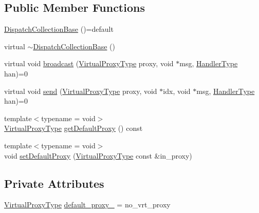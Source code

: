 \subsection*{Public Member Functions}
\begin{DoxyCompactItemize}
\item 
\hyperlink{structvt_1_1vrt_1_1collection_1_1_dispatch_collection_base_a96f6594a04faa4519a553b18bf2b2e6d}{Dispatch\+Collection\+Base} ()=default
\item 
virtual \hyperlink{structvt_1_1vrt_1_1collection_1_1_dispatch_collection_base_a8c27f42a9b91fd31b0aa7b30da4d614c}{$\sim$\+Dispatch\+Collection\+Base} ()
\item 
virtual void \hyperlink{structvt_1_1vrt_1_1collection_1_1_dispatch_collection_base_a339eda5b1ee045a9ec400d34bf91ac97}{broadcast} (\hyperlink{namespacevt_a1b417dd5d684f045bb58a0ede70045ac}{Virtual\+Proxy\+Type} proxy, void $\ast$msg, \hyperlink{namespacevt_af64846b57dfcaf104da3ef6967917573}{Handler\+Type} han)=0
\item 
virtual void \hyperlink{structvt_1_1vrt_1_1collection_1_1_dispatch_collection_base_a7e409e791d9eafb8fea0f4f7d97ad860}{send} (\hyperlink{namespacevt_a1b417dd5d684f045bb58a0ede70045ac}{Virtual\+Proxy\+Type} proxy, void $\ast$idx, void $\ast$msg, \hyperlink{namespacevt_af64846b57dfcaf104da3ef6967917573}{Handler\+Type} han)=0
\item 
{\footnotesize template$<$typename  = void$>$ }\\\hyperlink{namespacevt_a1b417dd5d684f045bb58a0ede70045ac}{Virtual\+Proxy\+Type} \hyperlink{structvt_1_1vrt_1_1collection_1_1_dispatch_collection_base_a7ff0d68977083eb225da837b6a8cef7d}{get\+Default\+Proxy} () const
\item 
{\footnotesize template$<$typename  = void$>$ }\\void \hyperlink{structvt_1_1vrt_1_1collection_1_1_dispatch_collection_base_a3c5ad977c57108fdcfcc3c2b443428e3}{set\+Default\+Proxy} (\hyperlink{namespacevt_a1b417dd5d684f045bb58a0ede70045ac}{Virtual\+Proxy\+Type} const \&in\+\_\+proxy)
\end{DoxyCompactItemize}
\subsection*{Private Attributes}
\begin{DoxyCompactItemize}
\item 
\hyperlink{namespacevt_a1b417dd5d684f045bb58a0ede70045ac}{Virtual\+Proxy\+Type} \hyperlink{structvt_1_1vrt_1_1collection_1_1_dispatch_collection_base_ad192b793a3929262a6b44951b628d215}{default\+\_\+proxy\+\_\+} = no\+\_\+vrt\+\_\+proxy
\end{DoxyCompactItemize}


